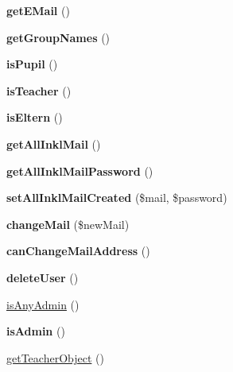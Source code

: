 \begin{DoxyCompactItemize}
{\bfseries get\+E\+Mail} ()
\item 
\mbox{\label{classuser_a6d85eeefdb971045db18a7cff8a4d117}} 
{\bfseries get\+Group\+Names} ()
\item 
\mbox{\label{classuser_a7075afc0da0f1bd40d804e3312bb1ab9}} 
{\bfseries is\+Pupil} ()
\item 
\mbox{\label{classuser_a2b611c5834143b06828540597c84cedd}} 
{\bfseries is\+Teacher} ()
\item 
\mbox{\label{classuser_ae6746d2d0a19409f79bd9de0876f8b4d}} 
{\bfseries is\+Eltern} ()
\item 
\mbox{\label{classuser_ae0cfab41627bbd4eb7ae811cd306e7a6}} 
{\bfseries get\+All\+Inkl\+Mail} ()
\item 
\mbox{\label{classuser_aa7b14e55df41bf2caac5132468115358}} 
{\bfseries get\+All\+Inkl\+Mail\+Password} ()
\item 
\mbox{\label{classuser_a64f043015c4c92eb0764a932cea5ebcd}} 
{\bfseries set\+All\+Inkl\+Mail\+Created} (\$mail, \$password)
\item 
\mbox{\label{classuser_a19254d7c755238736ca36d859fc8e256}} 
{\bfseries change\+Mail} (\$new\+Mail)
\item 
\mbox{\label{classuser_abdf84898bda5197d3d923715d886ce8a}} 
{\bfseries can\+Change\+Mail\+Address} ()
\item 
\mbox{\label{classuser_a803004404d4c3f8f789204ef7057cb03}} 
{\bfseries delete\+User} ()
\item 
\mbox{\hyperlink{classuser_a1f80a843c329ca4494043ef41f81f324}{is\+Any\+Admin}} ()
\item 
\mbox{\label{classuser_abf576adfee2d7bf9b1c2e3dfc70729bc}} 
{\bfseries is\+Admin} ()
\item 
\mbox{\hyperlink{classuser_abf5d10bc8b0da312ea245cb945060e50}{get\+Teacher\+Object}} ()
\item 
\mbox{\label{classuser_a4dbe156b78ce00cd98e5f4634299550a}} 

\end{DoxyCompactItemize}
